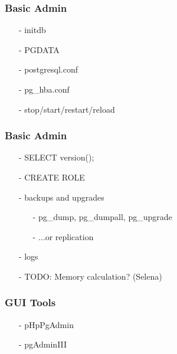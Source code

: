 \documentclass[20pt]{beamer}
\begin{document}
\frame
{
    \frametitle{Basic Admin}
    \begin{itemize}
    \item[-] initdb
    \item[-] PGDATA
    \item[-] postgresql.conf
    \item[-] pg\_hba.conf
    \item[-] stop/start/restart/reload
    \end{itemize}
}

\frame
{
    \frametitle{Basic Admin}
    \begin{itemize}
    \item[-] SELECT version();
    \item[-] CREATE ROLE
    \item[-] backups and upgrades
        \begin{itemize}
        \item[-] pg\_dump, pg\_dumpall, pg\_upgrade
        \item[-] $\ldots$or replication
        \end{itemize}
    \item[-] logs 
    \item[-] TODO:  Memory calculation?  (Selena)
    \end{itemize}
}

\frame
{
    \frametitle{GUI Tools}
    \begin{itemize}
    \item[-] pHpPgAdmin
    \item[-] pgAdminIII
    \end{itemize}
}


\end{document}
